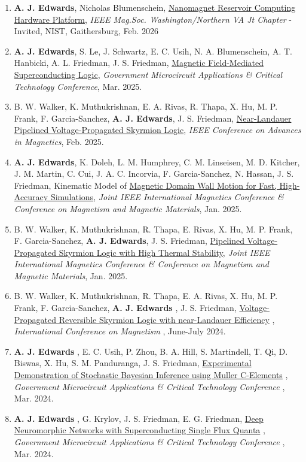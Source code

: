 \documentclass[12pt]{article}
\begin{document}
\begin{enumerate}
\item \textbf{A. J. Edwards}, Nicholas Blumenschein, \ul{Nanomagnet Reservoir Computing Hardware Platform}, \textit{IEEE Mag.Soc. Washington/Northern VA Jt Chapter} - Invited, NIST, Gaithersburg, Feb. 2026
\item \textbf{A. J. Edwards}, S. Le, J. Schwartz, E. C. Usih, N. A. Blumenschein, A. T. Hanbicki, A. L. Friedman, J. S. Friedman, \ul{Magnetic Field-Mediated Superconducting Logic}, \textit{Government Microcircuit Applications \& Critical Technology Conference}, Mar. 2025.
\item B. W. Walker, K. Muthukrishnan, E. A. Rivas, R. Thapa, X. Hu, M. P. Frank, F. Garcia-Sanchez, \textbf{A. J. Edwards}, J. S. Friedman, \ul{Near-Landauer Pipelined Voltage-Propagated Skyrmion Logic}, \textit{IEEE Conference on Advances in Magnetics}, Feb. 2025.
\item \textbf{A. J. Edwards}, K. Doleh, L. M. Humphrey, C. M. Linseisen, M. D. Kitcher, J. M. Martin, C. Cui, J. A. C. Incorvia, F. Garcia-Sanchez, N. Hassan, J. S. Friedman, Kinematic Model of \ul{Magnetic Domain Wall Motion for Fast, High-Accuracy Simulations}, \textit{Joint IEEE International Magnetics Conference \& Conference on Magnetism and Magnetic Materials}, Jan. 2025.
\item B. W. Walker, K. Muthukrishnan, R. Thapa, E. Rivas, X. Hu, M. P. Frank, F. Garcia-Sanchez, \textbf{A. J. Edwards}, J. S. Friedman, \ul{Pipelined Voltage-Propagated Skyrmion Logic with High Thermal Stability}, \textit{Joint IEEE International Magnetics Conference \& Conference on Magnetism and Magnetic Materials}, Jan. 2025.
    \item B. W. Walker, K. Muthukrishnan, R. Thapa, E. A. Rivas, X. Hu, M. P. Frank, F. Garcia-Sanchez, \textbf{A. J. Edwards} , J. S. Friedman, \ul{Voltage-Propagated Reversible Skyrmion Logic with near-Landauer Efficiency} , \textit{International Conference on Magnetism} , June-July 2024.
\item \textbf{A. J. Edwards} , E. C. Usih, P. Zhou, B. A. Hill, S. Martindell, T. Qi, D. Biswas, X. Hu, S. M. Panduranga, J. S. Friedman, \ul{Experimental Demonstration of Stochastic Bayesian Inference using Muller C-Elements} , \textit{Government Microcircuit Applications \& Critical Technology Conference} , Mar. 2024.
\item \textbf{A. J. Edwards} , G. Krylov, J. S. Friedman, E. G. Friedman, \ul{Deep Neuromorphic Networks with Superconducting Single Flux Quanta} , \textit{Government Microcircuit Applications \& Critical Technology Conference} , Mar. 2024.

\end{enumerate}
\end{document}
